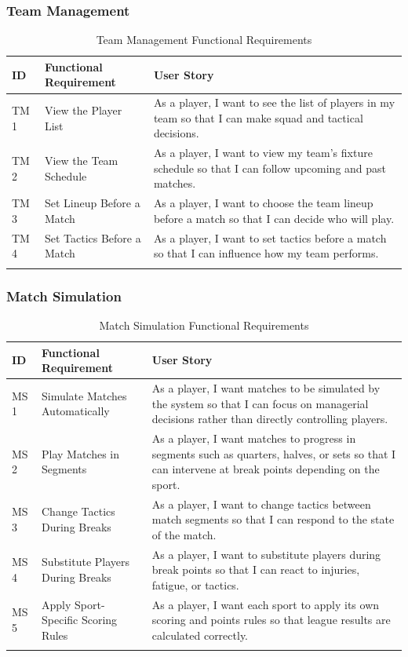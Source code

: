 \documentclass[12pt, a4paper]{article}
\begin{document}
\subsubsection*{Team Management}

\begin{longtable}{L{1.4cm} L{2.8cm} L{8.5cm}}
\toprule
\textbf{ID} & \textbf{Functional Requirement} & \textbf{User Story} \\
\midrule
\endhead
TM 1 & View the Player List &
    As a player, I want to see the list of players in my team so that I can make squad and tactical decisions. \\[0.4em]
TM 2 & View the Team Schedule &
    As a player, I want to view my team's fixture schedule so that I can follow upcoming and past matches. \\[0.4em]
TM 3 & Set Lineup Before a Match &
    As a player, I want to choose the team lineup before a match so that I can decide who will play. \\[0.4em]
TM 4 & Set Tactics Before a Match &
    As a player, I want to set tactics before a match so that I can influence how my team performs. \\
\bottomrule
\caption{Team Management Functional Requirements}
\end{longtable}

\subsubsection*{Match Simulation}

\begin{longtable}{L{1.4cm} L{2.8cm} L{8.5cm}}
\toprule
\textbf{ID} & \textbf{Functional Requirement} & \textbf{User Story} \\
\midrule
\endhead
MS 1 & Simulate Matches Automatically &
    As a player, I want matches to be simulated by the system so that I can focus on managerial decisions rather than directly controlling players. \\[0.4em]
MS 2 & Play Matches in Segments &
    As a player, I want matches to progress in segments such as quarters, halves, or sets so that I can intervene at break points depending on the sport. \\[0.4em]
MS 3 & Change Tactics During Breaks &
    As a player, I want to change tactics between match segments so that I can respond to the state of the match. \\[0.4em]
MS 4 & Substitute Players During Breaks &
    As a player, I want to substitute players during break points so that I can react to injuries, fatigue, or tactics. \\[0.4em]
MS 5 & Apply Sport-Specific Scoring Rules &
    As a player, I want each sport to apply its own scoring and points rules so that league results are calculated correctly. \\
\bottomrule
\caption{Match Simulation Functional Requirements}
\end{longtable}
\end{document}
